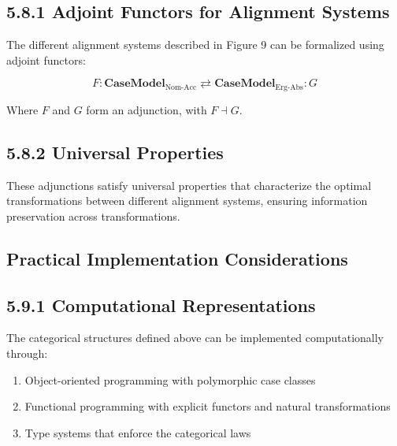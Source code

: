 \documentclass[
  11pt,
  letterpaper,
]{article}
\providecommand{\tightlist}{%
  \setlength{\itemsep}{0pt}\setlength{\parskip}{0pt}}
\begin{document}
\hypertarget{adjoint-functors-for-alignment-systems}{%
\subsection{5.8.1 Adjoint Functors for Alignment
Systems}\label{adjoint-functors-for-alignment-systems}}

The different alignment systems described in Figure 9 can be formalized
using adjoint functors:

\[F: \mathbf{CaseModel}_{\text{Nom-Acc}} \rightleftarrows \mathbf{CaseModel}_{\text{Erg-Abs}}: G\]

Where \(F\) and \(G\) form an adjunction, with \(F \dashv G\).

\hypertarget{universal-properties}{%
\subsection{5.8.2 Universal Properties}\label{universal-properties}}

These adjunctions satisfy universal properties that characterize the
optimal transformations between different alignment systems, ensuring
information preservation across transformations.

\hypertarget{practical-implementation-considerations}{%
\subsection{Practical Implementation
Considerations}\label{practical-implementation-considerations}}

\hypertarget{computational-representations}{%
\subsection{5.9.1 Computational
Representations}\label{computational-representations}}

The categorical structures defined above can be implemented
computationally through:

\begin{enumerate}
\def\labelenumi{\arabic{enumi}.}
\tightlist
\item
  Object-oriented programming with polymorphic case classes
\item
  Functional programming with explicit functors and natural
  transformations
\item
  Type systems that enforce the categorical laws
\end{enumerate}
\end{document}
